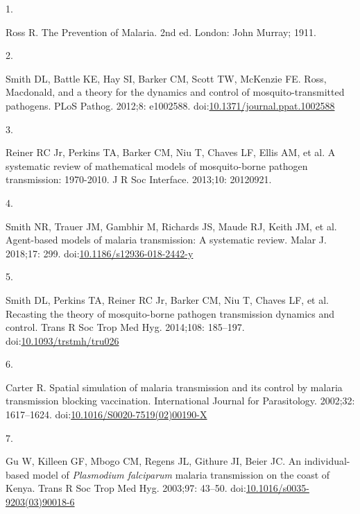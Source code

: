 \documentclass[
]{book}
\newlength{\cslhangindent}
\newlength{\csllabelwidth}
\newlength{\cslentryspacingunit} %
\newenvironment{CSLReferences}[2] %
 {%
  \setlength{\parindent}{0pt}
  \ifodd #1
  \let\oldpar\par
  \def\par{\hangindent=\cslhangindent\oldpar}
  \fi
  \setlength{\parskip}{#2\cslentryspacingunit}
 }%
 {}
\newcommand{\CSLLeftMargin}[1]{\parbox[t]{\csllabelwidth}{#1}}
\newcommand{\CSLRightInline}[1]{\parbox[t]{\linewidth - \csllabelwidth}{#1}\break}
\begin{document}
\hypertarget{refs}{}
\begin{CSLReferences}{0}{0}
\leavevmode{}%
\CSLLeftMargin{1. }%
\CSLRightInline{Ross R. The {Prevention} of {Malaria}. 2nd ed. London: John Murray; 1911. }

\leavevmode{}%
\CSLLeftMargin{2. }%
\CSLRightInline{Smith DL, Battle KE, Hay SI, Barker CM, Scott TW, McKenzie FE. Ross, {Macdonald}, and a theory for the dynamics and control of mosquito-transmitted pathogens. PLoS Pathog. 2012;8: e1002588. doi:\href{https://doi.org/10.1371/journal.ppat.1002588}{10.1371/journal.ppat.1002588}}

\leavevmode{}%
\CSLLeftMargin{3. }%
\CSLRightInline{Reiner RC Jr, Perkins TA, Barker CM, Niu T, Chaves LF, Ellis AM, et al. A systematic review of mathematical models of mosquito-borne pathogen transmission: 1970-2010. J R Soc Interface. 2013;10: 20120921. }

\leavevmode{}%
\CSLLeftMargin{4. }%
\CSLRightInline{Smith NR, Trauer JM, Gambhir M, Richards JS, Maude RJ, Keith JM, et al. Agent-based models of malaria transmission: {A} systematic review. Malar J. 2018;17: 299. doi:\href{https://doi.org/10.1186/s12936-018-2442-y}{10.1186/s12936-018-2442-y}}

\leavevmode{}%
\CSLLeftMargin{5. }%
\CSLRightInline{Smith DL, Perkins TA, Reiner RC Jr, Barker CM, Niu T, Chaves LF, et al. Recasting the theory of mosquito-borne pathogen transmission dynamics and control. Trans R Soc Trop Med Hyg. 2014;108: 185--197. doi:\href{https://doi.org/10.1093/trstmh/tru026}{10.1093/trstmh/tru026}}

\leavevmode{}%
\CSLLeftMargin{6. }%
\CSLRightInline{Carter R. Spatial simulation of malaria transmission and its control by malaria transmission blocking vaccination. International Journal for Parasitology. 2002;32: 1617--1624. doi:\href{https://doi.org/10.1016/S0020-7519(02)00190-X}{10.1016/S0020-7519(02)00190-X}}

\leavevmode{}%
\CSLLeftMargin{7. }%
\CSLRightInline{Gu W, Killeen GF, Mbogo CM, Regens JL, Githure JI, Beier JC. An individual-based model of \emph{{Plasmodium} falciparum} malaria transmission on the coast of {Kenya}. Trans R Soc Trop Med Hyg. 2003;97: 43--50. doi:\href{https://doi.org/10.1016/s0035-9203(03)90018-6}{10.1016/s0035-9203(03)90018-6}}


\end{CSLReferences}
\end{document}
